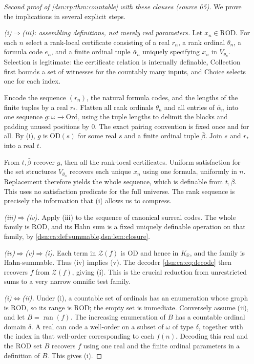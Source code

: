 \documentclass[11pt,a4paper]{article}
\numberwithin{equation}{section}
\theoremstyle{definition}
\theoremstyle{remark}
\newcommand{\Ord}{\mathrm{Ord}}
\newcommand{\OD}{\mathrm{OD}}
\newcommand{\R}{\mathbb R}
\newcommand{\ROD}{\mathrm{ROD}}
\newcommand{\KR}{K_{\R}}
\newcommand{\Zc}{\mathcal Z}
\begin{document}
\begin{proof}[Second proof of \cref{dsn:rp:thm:countable} with these clauses (source 05)]
We prove the implications in several explicit steps.

\emph{(i)$\Rightarrow$(iii): assembling definitions, not merely real
parameters.} Let $x_n\in\ROD$. For each $n$ select a rank-local
certificate consisting of a real $r_n$, a rank ordinal $\theta_n$, a
formula code $e_n$, and a finite ordinal tuple $\bar\alpha_n$ uniquely
specifying $x_n$ in $V_{\theta_n}$. Selection is legitimate: the
certificate relation is internally definable, Collection first bounds
a set of witnesses for the countably many inputs, and Choice selects
one for each index.

Encode the sequence $(r_n)$, the natural formula codes, and the lengths
of the finite tuples by a real $r_*$. Flatten all rank ordinals
$\theta_n$ and all entries of $\bar\alpha_n$ into one sequence
$g:\omega\to\Ord$, using the tuple lengths to delimit the blocks and
padding unused positions by $0$. The exact pairing convention is fixed
once and for all. By (i), $g$ is $\OD(s)$ for some real $s$ and a finite
ordinal tuple $\bar\beta$. Join $s$ and $r_*$ into a real $t$.

From $t,\bar\beta$ recover $g$, then all the rank-local certificates.
Uniform satisfaction for the set structures $V_{\theta_n}$ recovers
each unique $x_n$ using one formula, uniformly in $n$. Replacement
therefore yields the whole sequence, which is definable from
$t,\bar\beta$. This uses no satisfaction predicate for the full
universe. The rank sequence is precisely the information that (i)
allows us to compress.

\emph{(iii)$\Rightarrow$(iv).} Apply (iii) to the sequence of canonical
surreal codes. The whole family is $\ROD$, and its Hahn sum is a fixed
uniquely definable operation on that family, by
\cref{dsn:ca:def:summable,dsn:lem:closure}.

\emph{(iv)$\Rightarrow$(v)$\Rightarrow$(i).} Each term in
$\Zc(f)$ is $\OD$ and hence in $\KR$, and the family is
Hahn-summable. Thus (iv) implies (v). The decoder
\eqref{dsn:ca:eq:decode} then recovers $f$ from $\Zc(f)$, giving (i).
This is the crucial reduction from unrestricted sums to a very narrow
omnific test family.

\emph{(i)$\Leftrightarrow$(ii).} Under (i), a countable set of ordinals
has an enumeration whose graph is $\ROD$, so its range is $\ROD$;
the empty set is immediate. Conversely assume (ii), and let
$B=\operatorname{ran}(f)$. The increasing enumeration of $B$ has a
countable ordinal domain $\delta$. A real can code a well-order on a
subset of $\omega$ of type $\delta$, together with the index in that
well-order corresponding to each $f(n)$. Decoding this real and the
$\ROD$ set $B$ recovers $f$ using one real and the finite ordinal
parameters in a definition of $B$. This gives (i).


\end{proof}
\end{document}

